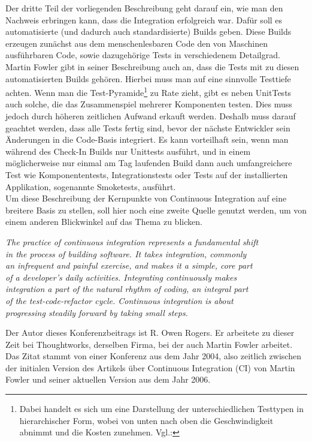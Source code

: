 Der dritte Teil der vorliegenden Beschreibung geht darauf ein, wie man den Nachweis erbringen kann, dass die Integration erfolgreich war. Dafür soll es automatisierte (und dadurch auch standardisierte) Builds geben. Diese Builds erzeugen zunächst aus dem menschenlesbaren Code den von Maschinen ausführbaren Code, sowie dazugehörige Tests in verschiedenem Detailgrad. Martin Fowler gibt in seiner Beschreibung auch an, dass die Tests mit zu diesen automatisierten Builds gehören. Hierbei muss man auf eine sinnvolle Testtiefe achten. Wenn man die Test-Pyramide\footnote{Dabei handelt es sich um eine Darstellung der unterschiedlichen Testtypen in hierarchischer Form, wobei von unten nach oben die Geschwindigkeit abnimmt und die Kosten zunehmen. Vgl.:\cite{fowler-Testpyramid}} zu Rate zieht, gibt es neben UnitTests auch solche, die das Zusammenspiel mehrerer Komponenten testen. Dies muss jedoch durch höheren zeitlichen Aufwand erkauft werden. Deshalb muss darauf geachtet werden, dass alle Tests fertig sind, bevor der nächste Entwickler sein Änderungen in die Code-Basis integriert. Es kann vorteilhaft sein, wenn man während des Check-In Builds nur Unittests ausführt, und in einem möglicherweise nur einmal am Tag laufenden Build dann auch umfangreichere Test wie Komponententests, Integrationstests oder Tests auf der installierten Applikation, sogenannte Smoketests, ausführt.\\
Um diese Beschreibung der Kernpunkte von Continuous Integration auf eine breitere Basis zu stellen, soll hier noch eine zweite Quelle genutzt werden, um von einem anderen Blickwinkel auf das Thema zu blicken.
\begin{center}
	\textit{
The practice of continuous integration represents a fundamental shift\\ in the process of building software. It takes integration, commonly\\
an infrequent and painful exercise, and makes it a simple, core part\\ of a developer’s daily activities. Integrating continuously makes\\ integration a part of the natural rhythm of coding, an integral part\\ of the test-code-refactor cycle. Continuous integration is about\\ progressing steadily forward by taking small steps.}\\ \cite{10.1007/978-3-540-24853-8_8}
\end{center}
Der Autor dieses Konferenzbeitrags ist R. Owen Rogers. Er arbeitete zu dieser Zeit bei Thoughtworks, derselben Firma, bei der auch Martin Fowler arbeitet. Das Zitat stammt von einer Konferenz aus dem Jahr 2004, also zeitlich zwischen der initialen Version des Artikels über Continuous Integration (CI) von Martin Fowler und seiner aktuellen Version aus dem Jahr 2006.\\

